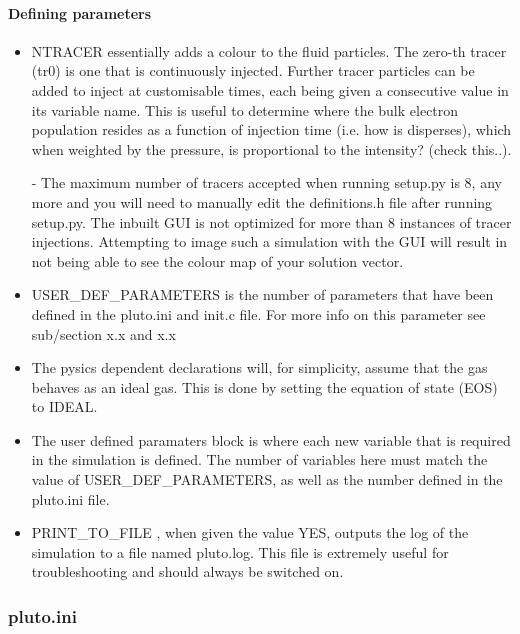 \documentclass[12pt]{article}
\begin{document}
\paragraph{Defining parameters}
\begin{itemize}
\item NTRACER essentially adds a colour to the fluid particles. The zero-th tracer (tr0)  is one that is continuously injected. Further tracer particles can be added to inject at customisable times, each being given a consecutive value in its variable name. This is useful to determine where the bulk electron population resides as a function of injection time (i.e. how is disperses), which when weighted by the pressure, is proportional to the intensity? (check this..). 

\subitem - The maximum number of tracers accepted when running setup.py is 8, any more and you will need to manually edit the definitions.h file after running setup.py. The inbuilt GUI is not optimized for more than 8 instances of tracer injections. Attempting to image such a simulation with the GUI will result in not being able to see the colour map of your solution vector.

\item USER\_DEF\_PARAMETERS is the number of parameters that have been defined in the pluto.ini and init.c file. For more info on this parameter see sub/section x.x and x.x 

\item The pysics dependent declarations will, for simplicity, assume that the gas behaves as an ideal gas. This is done by setting the equation of state (EOS) to IDEAL.

\item The user defined paramaters block is where each new variable that is required in the simulation is defined. The number of variables here must match the value of USER\_DEF\_PARAMETERS, as well as the number defined in the pluto.ini file.

 \item PRINT\_TO\_FILE , when given the value YES, outputs the log of the simulation to a file named pluto.log. This file is extremely useful for troubleshooting and should always be switched on.
\end{itemize}

\subsubsection{pluto.ini}
\end{document}
